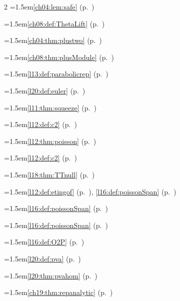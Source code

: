 \begin{multicols}{2}
\hangindent=1.5em\quad \ref{ch04:lem:safe} (p.~\pageref{ch04:lem:safe})\par
\hangindent=1.5em\quad \ref{ch08:def:ThetaLift} (p.~\pageref{ch08:def:ThetaLift})\par
\hangindent=1.5em\quad \ref{ch04:thm:plustwo} (p.~\pageref{ch04:thm:plustwo})\par
\hangindent=1.5em\quad \ref{ch08:thm:plusModule} (p.~\pageref{ch08:thm:plusModule})\par
\hangindent=1.5em\quad \ref{l13:def:parabolicrep} (p.~\pageref{l13:def:parabolicrep})\par
\hangindent=1.5em\quad \ref{l20:def:euler} (p.~\pageref{l20:def:euler})\par
\hangindent=1.5em\quad \ref{l11:thm:squeeze} (p.~\pageref{l11:thm:squeeze})\par
\hangindent=1.5em\quad \ref{l12:def:c2} (p.~\pageref{l12:def:c2})\par
\hangindent=1.5em\quad \ref{l12:thm:poisson} (p.~\pageref{l12:thm:poisson})\par
\hangindent=1.5em\quad \ref{l12:def:c2} (p.~\pageref{l12:def:c2})\par
\hangindent=1.5em\quad \ref{l18:thm:TTnull} (p.~\pageref{l18:thm:TTnull})\par
\hangindent=1.5em\quad \ref{l12:def:etingof} (p.~\pageref{l12:def:etingof}), \ref{l16:def:poissonSpan} (p.~\pageref{l16:def:poissonSpan})\par
\hangindent=1.5em\quad \ref{l16:def:poissonSpan} (p.~\pageref{l16:def:poissonSpan})\par
\hangindent=1.5em\quad \ref{l16:def:poissonSpan} (p.~\pageref{l16:def:poissonSpan})\par
\hangindent=1.5em\quad \ref{l16:def:O2P} (p.~\pageref{l16:def:O2P})\par
\hangindent=1.5em\quad \ref{l20:def:pva} (p.~\pageref{l20:def:pva})\par
\hangindent=1.5em\quad \ref{l20:thm:pvahom} (p.~\pageref{l20:thm:pvahom})\par
\hangindent=1.5em\quad \ref{ch19:thm:repanalytic} (p.~\pageref{ch19:thm:repanalytic})\par

\end{multicols}
